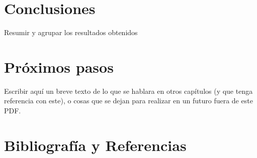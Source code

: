 \section{Conclusiones}
Resumir y agrupar los resultados obtenidos
\section{Próximos pasos}
Escribir aquí un breve texto de lo que se hablara en otros capítulos (y que tenga referencia con este), o cosas que se dejan para realizar en un futuro fuera de este PDF.
\section{Bibliografía y Referencias}
\printbibliography[heading=subbibliography]